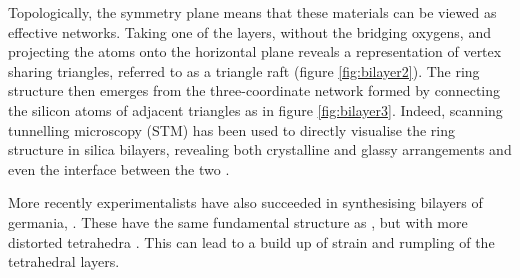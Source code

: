 Topologically, the symmetry plane means that these materials can be viewed as effective \td{} networks.
Taking one of the layers, without the bridging oxygens, and projecting the atoms onto the horizontal plane reveals a representation of vertex sharing triangles, referred to as a triangle raft (figure \ref{fig:bilayer2}).
The ring structure then emerges from the three\--coordinate network formed by connecting the silicon atoms of adjacent triangles as in figure \ref{fig:bilayer3}.
Indeed, scanning tunnelling microscopy (STM) has been used to directly visualise the ring structure in silica bilayers, revealing both crystalline and glassy arrangements and even the interface between the two   \cite{Loffler2010,Lichtenstein2012b}.

More recently experimentalists have also succeeded in synthesising bilayers of germania, \geoii{} \cite{Lewandowski2018,Lewandowski2019}.
These have the same fundamental structure as \sioii{}, but with more distorted tetrahedra .
This can lead to a build up of strain and rumpling of the tetrahedral layers.

